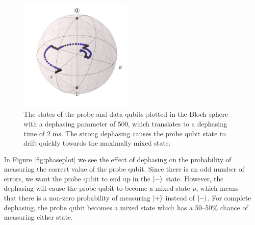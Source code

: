 \begin{figure}[!h]
  \centering
    \includegraphics[width=0.5\textwidth]{Figures/Circ_orbit_odd_500_dephasing.png}
      \caption{The states of the probe and data qubits plotted in the Bloch sphere with a dephasing parameter of 500, which translates to a dephasing time of 2 ms. The strong dephasing causes the probe qubit state to drift quickly towards the maximally mixed state. }
      \label{fig:BlochsphereDephasing2}
\end{figure}

In Figure \ref{fig:phaseplot} we see the effect of dephasing on the probability of measuring the correct value of the probe qubit. Since there is an odd number of errors, we want the probe qubit to end up in the $\ket{-}$ state. However, the dephasing will cause the probe qubit to become a mixed state $\rho$, which means that there is a non-zero probability of measuring $\ket{+} $ instead of $\ket{-}$. For complete dephasing, the probe qubit becomes a mixed state which has a 50--50\% chance of measuring either state. 


